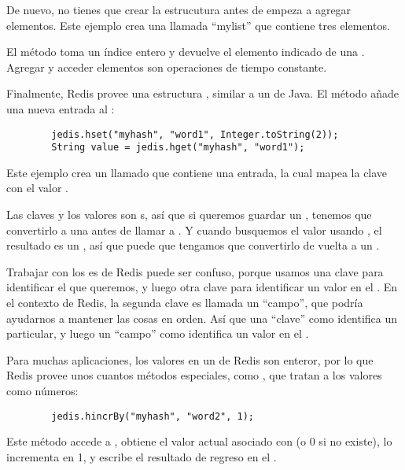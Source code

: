 \documentclass[12pt]{book}
\theoremstyle{exercise}
\begin{document}
De nuevo, no tienes que crear la estrucutura antes de empeza a agregar
elementos. Este ejemplo crea una  llamada ``mylist'' que
contiene tres elementos.


El método  toma un índice entero y devuelve el
elemento indicado de una . Agregar y acceder elementos son
operaciones de tiempo constante.

Finalmente, Redis provee una estructura , similar a un
 de Java. El método
 añade una nueva entrada al :

\begin{verbatim}
        jedis.hset("myhash", "word1", Integer.toString(2));
        String value = jedis.hget("myhash", "word1");
\end{verbatim}

Este ejemplo crea un  llamado  que contiene una
entrada, la cual mapea la clave  con el valor .

Las claves y los valores son s, así que si queremos guardar
un , tenemos que convertirlo a una
 antes de llamar a . 
Y cuando busquemos el valor usando ,
el resultado es un , así que puede que tengamos que convertirlo
de vuelta a un .


Trabajar con los es de Redis puede ser confuso, porque usamos una clave para
identificar el  que queremos, y luego otra clave para identificar un valor en
el . En el contexto de Redis, la segunda clave es llamada un ``campo'',
que podría ayudarnos a mantener las cosas en orden. Así que una ``clave'' como 
identifica un  particular, y luego un ``campo'' como 
identifica un valor en el .

Para muchas aplicaciones, los valores en un  de Redis son enteror, por lo que Redis
provee unos cuantos métodos especiales, como , que tratan a los valores como
números:

\begin{verbatim}
        jedis.hincrBy("myhash", "word2", 1);
\end{verbatim}

Este método accede a , obtiene el valor actual asociado
con  (o 0 si no existe), lo incrementa en
1, y escribe el resultado de regreso en el .
\end{document}
